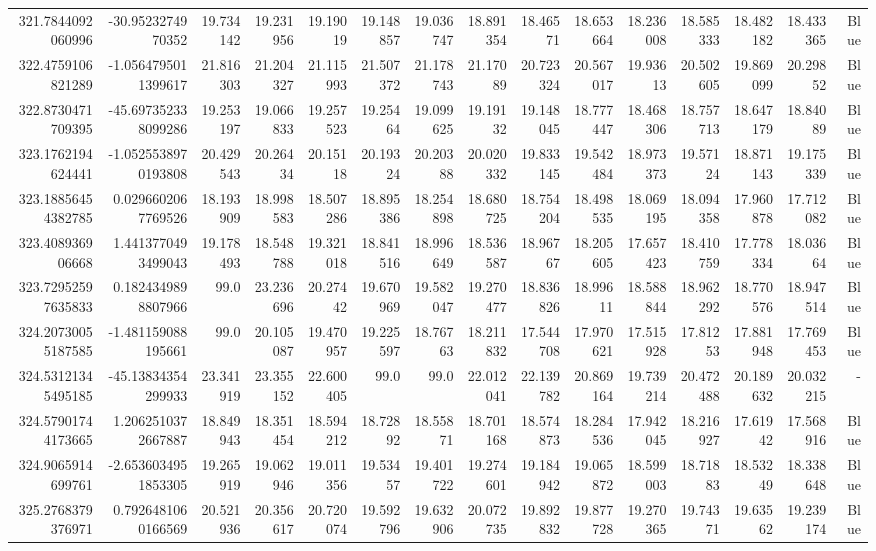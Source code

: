 \begin{center}
\begin{longtable}{rrrrrrrrrrrrrrr}
321.7844092060996 & -30.9523274970352 & 19.734142 & 19.231956 & 19.19019 & 19.148857 & 19.036747 & 18.891354 & 18.46571 & 18.653664 & 18.236008 & 18.585333 & 18.482182 & 18.433365 & Blue \\
322.4759106821289 & -1.0564795011399617 & 21.816303 & 21.204327 & 21.115993 & 21.507372 & 21.178743 & 21.17089 & 20.723324 & 20.567017 & 19.93613 & 20.502605 & 19.869099 & 20.29852 & Blue \\
322.8730471709395 & -45.697352338099286 & 19.253197 & 19.066833 & 19.257523 & 19.25464 & 19.099625 & 19.19132 & 19.148045 & 18.777447 & 18.468306 & 18.757713 & 18.647179 & 18.84089 & Blue \\
323.1762194624441 & -1.0525538970193808 & 20.429543 & 20.26434 & 20.15118 & 20.19324 & 20.20388 & 20.020332 & 19.833145 & 19.542484 & 18.973373 & 19.57124 & 18.871143 & 19.175339 & Blue \\
323.18856454382785 & 0.0296602067769526 & 18.193909 & 18.998583 & 18.507286 & 18.895386 & 18.254898 & 18.680725 & 18.754204 & 18.498535 & 18.069195 & 18.094358 & 17.960878 & 17.712082 & Blue \\
323.408936906668 & 1.4413770493499043 & 19.178493 & 18.548788 & 19.321018 & 18.841516 & 18.996649 & 18.536587 & 18.96767 & 18.205605 & 17.657423 & 18.410759 & 17.778334 & 18.03664 & Blue \\
323.72952597635833 & 0.1824349898807966 & 99.0 & 23.236696 & 20.27442 & 19.670969 & 19.582047 & 19.270477 & 18.836826 & 18.99611 & 18.588844 & 18.962292 & 18.770576 & 18.947514 & Blue \\
324.20730055187585 & -1.481159088195661 & 99.0 & 20.105087 & 19.470957 & 19.225597 & 18.76763 & 18.211832 & 17.544708 & 17.970621 & 17.515928 & 17.81253 & 17.881948 & 17.769453 & Blue \\
324.53121345495185 & -45.13834354299933 & 23.341919 & 23.355152 & 22.600405 & 99.0 & 99.0 & 22.012041 & 22.139782 & 20.869164 & 19.739214 & 20.472488 & 20.189632 & 20.032215 & - \\
324.57901744173665 & 1.2062510372667887 & 18.849943 & 18.351454 & 18.594212 & 18.72892 & 18.55871 & 18.701168 & 18.574873 & 18.284536 & 17.942045 & 18.216927 & 17.61942 & 17.568916 & Blue \\
324.9065914699761 & -2.6536034951853305 & 19.265919 & 19.062946 & 19.011356 & 19.53457 & 19.401722 & 19.274601 & 19.184942 & 19.065872 & 18.599003 & 18.71883 & 18.53249 & 18.338648 & Blue \\
325.2768379376971 & 0.7926481060166569 & 20.521936 & 20.356617 & 20.720074 & 19.592796 & 19.632906 & 20.072735 & 19.892832 & 19.877728 & 19.270365 & 19.74371 & 19.63562 & 19.239174 & Blue \\

\end{longtable}
\end{center}
